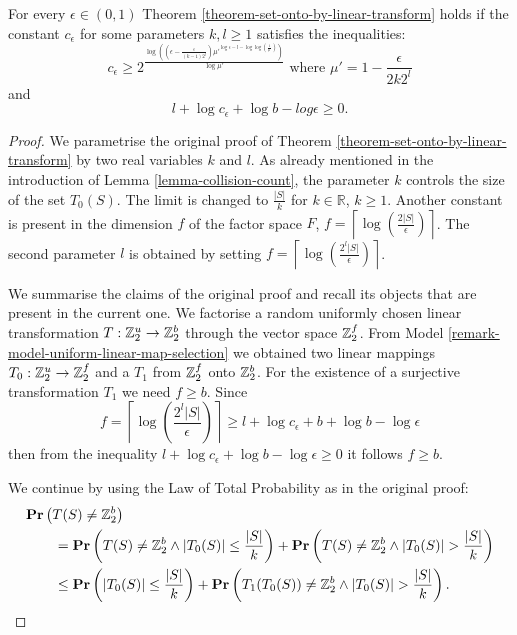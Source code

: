 \begin{statement}
\label{statement-good-c-e}
For every $\epsilon \in (0,1)$ Theorem \ref{theorem-set-onto-by-linear-transform} holds if the constant $c_{\epsilon}$ for some parameters $k, l \geq 1$ satisfies the inequalities:
\begin{equation}
\label{inequality-good-c-e}
c_\epsilon \geq 2 ^ {\frac{\log \left( \left( \epsilon - \frac{\epsilon}{(k - 1) 2 ^ l}\right) {\mu'}^{\log \epsilon - l - \log \log \left(\frac{1}{\mu'}\right)}\right)}{\log \mu'}} \text{ where $\mu' = 1 - \frac{\epsilon}{2k2 ^ l}$}
\end{equation}
and 
\[
	l + \log c_{\epsilon} + \log b  - log \epsilon \geq 0 \text{.}
\]
\end{statement}
\begin{proof}
We parametrise the original proof of Theorem \ref{theorem-set-onto-by-linear-transform} by two real variables $k$ and $l$. As already mentioned in the introduction of Lemma \ref{lemma-collision-count}, the parameter $k$ controls the size of the set $T_0(S)$. The limit is changed to $\frac{|S|}{k}$ for $k \in \mathbb{R}$, $k \geq 1$. Another constant is present in the dimension $f$ of the factor space $F$, $f = \left\lceil \log \left(\frac{2|S|}{\epsilon}\right) \right\rceil$. The second parameter $l$ is obtained by setting $f = \left\lceil \log \left( \frac{2 ^ l |S|}{\epsilon} \right) \right\rceil$.

We summarise the claims of the original proof and recall its objects that are present in the current one. We factorise a random uniformly chosen linear transformation $T: \mathbb{Z}_{2}^{u} \rightarrow \mathbb{Z}_{2}^{b}$ through the vector space $\mathbb{Z}_{2}^{f}$. From Model \ref{remark-model-uniform-linear-map-selection} we obtained two linear mappings $T_0: \mathbb{Z}_{2}^{u} \rightarrow \mathbb{Z}_{2}^{f}$ and a $T_1$ from $\mathbb{Z}_{2}^{f}$ onto $\mathbb{Z}_{2}^{b}$. For the existence of a surjective transformation $T_1$ we need $f \geq b$. Since \[ f = \left\lceil \log\left(\frac{2 ^ l |S|}{\epsilon}\right) \right\rceil \geq l + \log c_{\epsilon} + b + \log b - \log \epsilon \] then from the inequality $l + \log c_{\epsilon} + \log b -\log \epsilon \geq 0$ it follows $f \geq b$.

We continue by using the Law of Total Probability as in the original proof:
\[
\begin{split}
& \mathbf{Pr}\left(T(S) \neq \mathbb{Z}_{2}^{b}\right) \\
    & \qquad = \mathbf{Pr}\left(T(S) \neq \mathbb{Z}_{2}^{b} \wedge |T_0(S)| \leq \frac{|S|}{k}\right) + \mathbf{Pr}\left(T(S) \neq \mathbb{Z}_{2}^{b} \wedge |T_0(S)| > \frac{|S|}{k}\right) \\ 
    & \qquad \leq \mathbf{Pr}\left(|T_0(S)| \leq \frac{|S|}{k}\right) + \mathbf{Pr}\left(T_1(T_0(S)) \neq \mathbb{Z}_{2}^{b} \wedge |T_0(S)| > \frac{|S|}{k}\right) \text{.}
\end{split}
\]


\end{proof}
